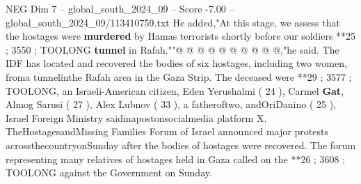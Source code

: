 \begin{textsample}{NEG Dim 7 – global\_south\_2024\_09 – Score -7.00 – global\_south\_2024\_09/113410759.txt}
He added,"At this stage, we assess that the hostages were \textbf{murdered} by Hamas terrorists shortly before our soldiers **25 ; 3550 ; TOOLONG \textbf{tunnel} in Rafah.""@ @ @ @ @ @ @ @ @ @,"he said.
The IDF has located and recovered the bodies of six hostages, including two women, froma tunnelinthe Rafah area in the Gaza Strip.
The deceased were **29 ; 3577 ; TOOLONG, an Israeli-American citizen, Eden Yerushalmi ( 24 ), Carmel \textbf{Gat}, Almog Sarusi ( 27 ), Alex Lubnov ( 33 ), a fatheroftwo, andOriDanino ( 25 ), Israel Foreign Ministry saidinapostonsocialmedia platform X.
TheHostagesandMissing Families Forum of Israel announced major protests acrossthecountryonSunday after the bodies of hostages were recovered.
The forum representing many relatives of hostages held in Gaza called on the **26 ; 3608 ; TOOLONG against the Government on Sunday.

\end{textsample}

